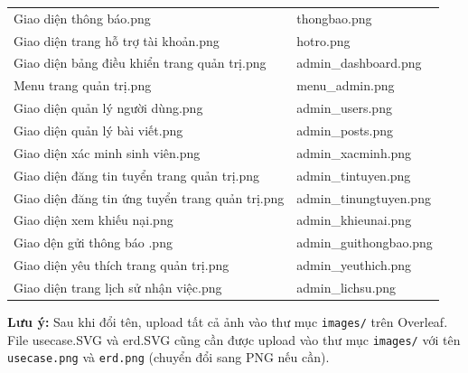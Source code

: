\documentclass[a4paper,13pt]{extreport}
\begin{document}
\begin{table}[H]
\begin{tabular}{|l|l|}
Giao diện thông báo.png & thongbao.png \\
Giao diện trang hỗ trợ tài khoản.png & hotro.png \\
Giao diện bảng điều khiển trang quản trị.png & admin\_dashboard.png \\
Menu trang quản trị.png & menu\_admin.png \\
Giao diện quản lý người dùng.png & admin\_users.png \\
Giao diện quản lý bài viết.png & admin\_posts.png \\
Giao diện xác minh sinh viên.png & admin\_xacminh.png \\
Giao diện đăng tin tuyển trang quản trị.png & admin\_tintuyen.png \\
Giao diện đăng tin ứng tuyển trang quản trị.png & admin\_tinungtuyen.png \\
Giao diện xem khiếu nại.png & admin\_khieunai.png \\
Giao dện gửi thông báo .png & admin\_guithongbao.png \\
Giao diện yêu thích trang quản trị.png & admin\_yeuthich.png \\
Giao diện trang lịch sử nhận việc.png & admin\_lichsu.png \\
\hline
\end{tabular}
\end{table}

\textbf{Lưu ý:} Sau khi đổi tên, upload tất cả ảnh vào thư mục \texttt{images/} trên Overleaf. File usecase.SVG và erd.SVG cũng cần được upload vào thư mục \texttt{images/} với tên \texttt{usecase.png} và \texttt{erd.png} (chuyển đổi sang PNG nếu cần).
\end{document}
